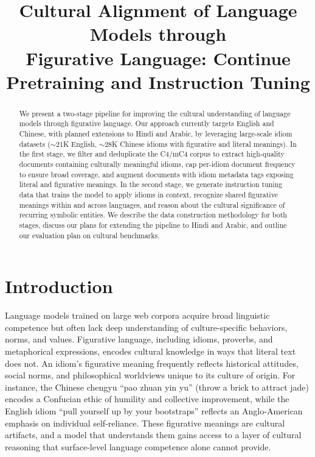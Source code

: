 \documentclass[11pt,a4paper]{article}
\title{Cultural Alignment of Language Models through\\Figurative Language: Continue Pretraining and Instruction Tuning}
\author{}
\date{}
\begin{document}
\maketitle

\begin{abstract}
We present a two-stage pipeline for improving the cultural understanding of language models through figurative language. Our approach currently targets English and Chinese, with planned extensions to Hindi and Arabic, by leveraging large-scale idiom datasets ($\sim$21K English, $\sim$28K Chinese idioms with figurative and literal meanings). In the first stage, we filter and deduplicate the C4/mC4 corpus to extract high-quality documents containing culturally meaningful idioms, cap per-idiom document frequency to ensure broad coverage, and augment documents with idiom metadata tags exposing literal and figurative meanings. In the second stage, we generate instruction tuning data that trains the model to apply idioms in context, recognize shared figurative meanings within and across languages, and reason about the cultural significance of recurring symbolic entities. We describe the data construction methodology for both stages, discuss our plans for extending the pipeline to Hindi and Arabic, and outline our evaluation plan on cultural benchmarks.
\end{abstract}

\section{Introduction}

Language models trained on large web corpora acquire broad linguistic competence but often lack deep understanding of culture-specific behaviors, norms, and values. Figurative language, including idioms, proverbs, and metaphorical expressions, encodes cultural knowledge in ways that literal text does not. An idiom's figurative meaning frequently reflects historical attitudes, social norms, and philosophical worldviews unique to its culture of origin. For instance, the Chinese chengyu ``pao zhuan yin yu'' (throw a brick to attract jade) encodes a Confucian ethic of humility and collective improvement, while the English idiom ``pull yourself up by your bootstraps'' reflects an Anglo-American emphasis on individual self-reliance. These figurative meanings are cultural artifacts, and a model that understands them gains access to a layer of cultural reasoning that surface-level language competence alone cannot provide.
\end{document}
